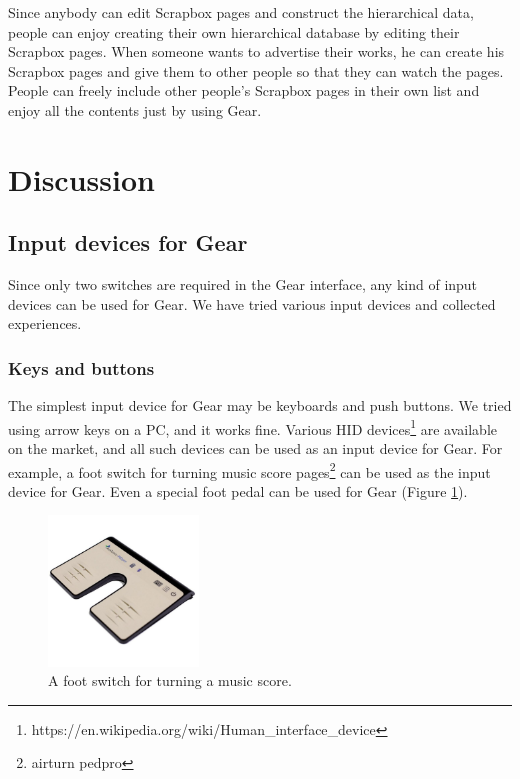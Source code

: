 \documentclass[conference]{IEEEtran}
\def\SB{Scrapbox}
\begin{document}
Since anybody can edit {\SB} pages and construct the hierarchical data,
people can enjoy creating their own hierarchical database by editing their {\SB} pages.
When someone wants to advertise their works,
he can create his {\SB} pages
and give them to other people so that they can watch the pages.
People can freely include other people's {\SB} pages in their own list
and enjoy all the contents just by using Gear.

\section{Discussion}

\subsection{Input devices for Gear}

Since only two switches are required in the Gear interface,
any kind of input devices can be used for Gear.
We have tried various input devices and collected experiences.

\subsubsection{Keys and buttons}

The simplest input device for Gear may be keyboards and push buttons.
We tried using arrow keys on a PC, and it works fine.
Various HID devices\footnote{
  https://en.wikipedia.org/wiki/Human\_interface\_device
} are available on the market, and
all such devices can be used as an input device for Gear.
For example, a foot switch for turning music score pages\footnote{
  airturn pedpro
} can be used as the input device for Gear.
Even a special foot pedal can be used for Gear (Figure \ref{footswitch}).

\begin{figure}[H]
\centerline{\includegraphics[width=40mm,bb=0 0 900 900]{figures/8d4f811f5a0c393acaff304102ba963f.jpg}}
\caption{A foot switch for turning a music score.}
\label{footswitch}
\end{figure}
\end{document}

